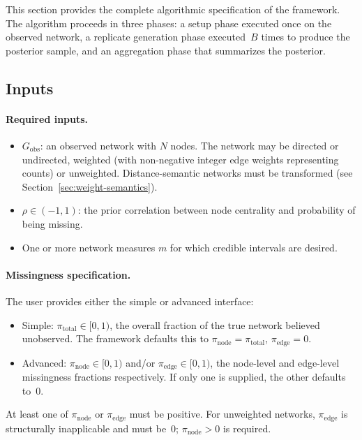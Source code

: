\documentclass[11pt]{article}
\newcommand{\Gobs}{G_{\text{obs}}}
\newcommand{\pinode}{\pi_{\text{node}}}
\newcommand{\piedge}{\pi_{\text{edge}}}
\newcommand{\pitotal}{\pi_{\text{total}}}
\begin{document}
This section provides the complete algorithmic specification of the framework. The algorithm proceeds in three phases: a setup phase executed once on the observed network, a replicate generation phase executed~$B$ times to produce the posterior sample, and an aggregation phase that summarizes the posterior.

\subsection{Inputs}

\paragraph{Required inputs.}
\begin{itemize}[leftmargin=*, itemsep=2pt]
  \item $\Gobs$: an observed network with $N$ nodes. The network may be directed or undirected, weighted (with non-negative integer edge weights representing counts) or unweighted. Distance-semantic networks must be transformed (see Section~\ref{sec:weight-semantics}).
  \item $\rho \in (-1, 1)$: the prior correlation between node centrality and probability of being missing.
  \item One or more network measures $m$ for which credible intervals are desired.
\end{itemize}

\paragraph{Missingness specification.} The user provides either the simple or advanced interface:
\begin{itemize}[leftmargin=*, itemsep=2pt]
  \item Simple: $\pitotal \in [0, 1)$, the overall fraction of the true network believed unobserved. The framework defaults this to $\pinode = \pitotal$, $\piedge = 0$.
  \item Advanced: $\pinode \in [0, 1)$ and/or $\piedge \in [0, 1)$, the node-level and edge-level missingness fractions respectively. If only one is supplied, the other defaults to~0.
\end{itemize}
At least one of $\pinode$ or $\piedge$ must be positive. For unweighted networks, $\piedge$ is structurally inapplicable and must be~0; $\pinode > 0$ is required.
\end{document}
